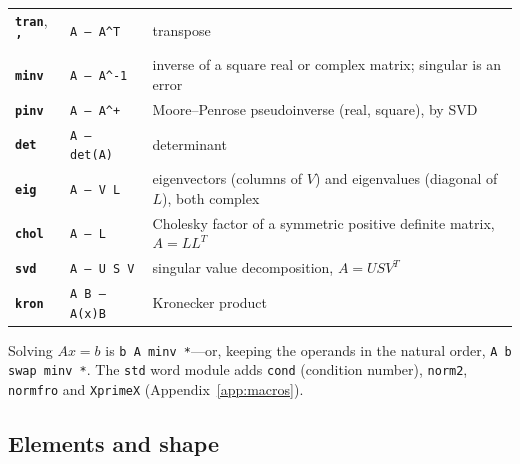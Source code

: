 \documentclass[11pt,letterpaper]{article}
\newcommand{\code}[1]{\texttt{#1}}
\newcommand{\cmd}[1]{\texttt{\textbf{#1}}}
\newcommand{\stk}[1]{\texttt{#1}}
\begin{document}
\begin{center}
\begin{tabular}{@{}llp{}@{}}
\toprule
\cmd{tran}, \cmd{'} & \stk{A -- A\textasciicircum T} & transpose \\
\cmd{minv} & \stk{A -- A\textasciicircum -1} & inverse of a square real or complex matrix; singular is an error \\
\cmd{pinv} & \stk{A -- A\textasciicircum +}  & Moore--Penrose pseudoinverse (real, square), by SVD \\
\cmd{det}  & \stk{A -- det(A)} & determinant \\
\cmd{eig}  & \stk{A -- V L}    & eigenvectors (columns of $V$) and eigenvalues (diagonal of $L$), both complex \\
\cmd{chol} & \stk{A -- L}      & Cholesky factor of a symmetric positive definite matrix, $A = LL^T$ \\
\cmd{svd}  & \stk{A -- U S V}  & singular value decomposition, $A = U S V^T$ \\
\cmd{kron} & \stk{A B -- A(x)B} & Kronecker product \\
\bottomrule
\end{tabular}
\end{center}
Solving $Ax = b$ is \code{b A minv *}---or, keeping the operands in the natural order, \code{A b swap minv *}. The \code{std} word module adds \code{cond} (condition number), \code{norm2}, \code{normfro} and \code{XprimeX} (Appendix~\ref{app:macros}).

\subsection{Elements and shape}
\end{document}
